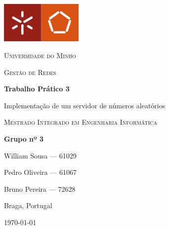 \begin{titlepage}
	\thispagestyle{empty}
	\centering
	\includegraphics[width=0.30\textwidth]{resources/template/logo-ee.png}\par\vspace{1cm}
	
	{\scshape\LARGE Universidade do Minho \par}
	\vspace{1cm}
	{\scshape\Large Gestão de Redes \par}
	\vspace{1.5cm}
	{\huge\bfseries
		Trabalho Prático 3\par
		\vspace{0.5cm}
Implementação de um servidor de números aleatórios}
	\vspace{2cm}
	
	{\scshape\Large Mestrado Integrado em Engenharia Informática\par}
	\vfill
	\textbf{Grupo nº 3}\par
	William Sousa  --- 61029\par
	Pedro Oliveira --- 61067\par
	Bruno Pereira  --- 72628
	\vfill
	
	{\large Braga, Portugal\par \today\par}
\end{titlepage}
\newpage

